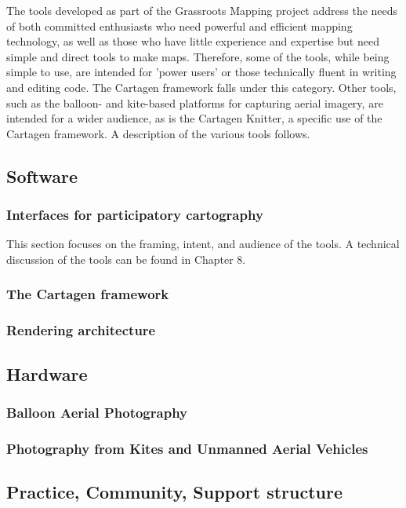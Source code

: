 \documentclass[11pt]{report}
\begin{document}
The tools developed as part of the Grassroots Mapping project address the needs of both committed enthusiasts who need powerful and efficient mapping technology, as well as those who have little experience and expertise but need simple and direct tools to make maps. Therefore, some of the tools, while being simple to use, are intended for 'power users' or those technically fluent in writing and editing code. The Cartagen framework falls under this category. Other tools, such as the balloon- and kite-based platforms for capturing aerial imagery, are intended for a wider audience, as is the Cartagen Knitter, a specific use of the Cartagen framework. A description of the various tools follows.

\subsection{Software}

\subsubsection{Interfaces for participatory cartography}

This section focuses on the framing, intent, and audience of the tools. A technical discussion of the tools can be found in Chapter 8. 

\subsubsection{The Cartagen framework}
\subsubsection*{Rendering architecture}
\subsection{Hardware}
\subsubsection{Balloon Aerial Photography}
\subsubsection{Photography from Kites and Unmanned Aerial Vehicles}
\subsection{Practice, Community, Support structure}
\end{document}
